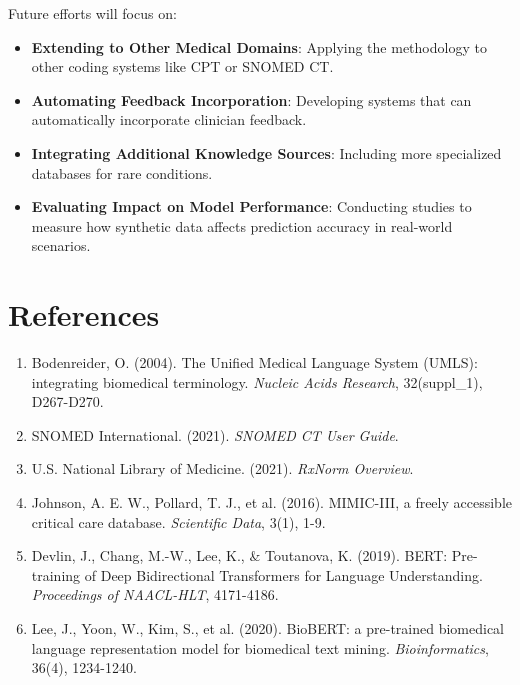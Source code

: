 \documentclass[12pt, a4paper]{article}
\begin{document}
Future efforts will focus on:

\begin{itemize}
    \item \textbf{Extending to Other Medical Domains}: Applying the methodology to other coding systems like CPT or SNOMED CT.
    \item \textbf{Automating Feedback Incorporation}: Developing systems that can automatically incorporate clinician feedback.
    \item \textbf{Integrating Additional Knowledge Sources}: Including more specialized databases for rare conditions.
    \item \textbf{Evaluating Impact on Model Performance}: Conducting studies to measure how synthetic data affects prediction accuracy in real-world scenarios.
\end{itemize}

\section*{References}

\begin{enumerate}
    \item Bodenreider, O. (2004). The Unified Medical Language System (UMLS): integrating biomedical terminology. \textit{Nucleic Acids Research}, 32(suppl\_1), D267-D270.
    \item SNOMED International. (2021). \textit{SNOMED CT User Guide}.
    \item U.S. National Library of Medicine. (2021). \textit{RxNorm Overview}.
    \item Johnson, A. E. W., Pollard, T. J., et al. (2016). MIMIC-III, a freely accessible critical care database. \textit{Scientific Data}, 3(1), 1-9.
    \item Devlin, J., Chang, M.-W., Lee, K., \& Toutanova, K. (2019). BERT: Pre-training of Deep Bidirectional Transformers for Language Understanding. \textit{Proceedings of NAACL-HLT}, 4171-4186.
    \item Lee, J., Yoon, W., Kim, S., et al. (2020). BioBERT: a pre-trained biomedical language representation model for biomedical text mining. \textit{Bioinformatics}, 36(4), 1234-1240.
\end{enumerate}
\end{document}
